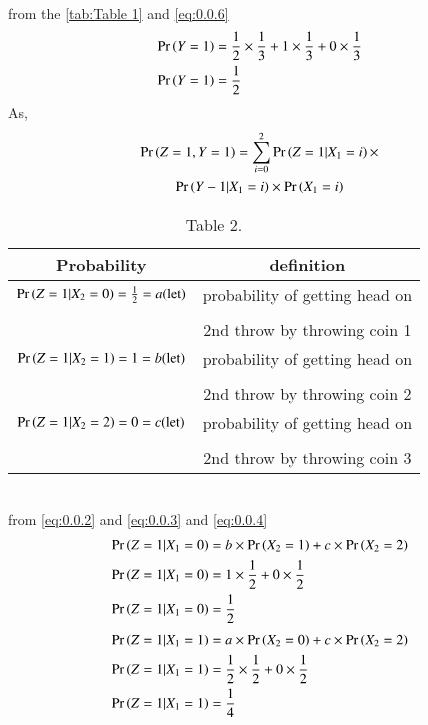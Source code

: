 \documentclass[journal,12pt,twocolumn]{IEEEtran}
\begin{document}
\\
from the \ref{tab:Table 1} and \eqref{eq:0.0.6}
\begin{align}
   \Pr\left(Y=1\right)&=\frac{1}{2} \times \frac{1}{3}+1 \times \frac{1}{3}+ 0 \times \frac{1}{3}\\
   \Pr\left(Y=1\right)&=\frac{1}{2}\label{eq:0.0.8}
\end{align}
\newpage
As,
\begin{multline}
    \Pr\left(Z=1,Y=1\right)=\sum_{i=0}^{2} \Pr\left(Z=1|X_1=i\right) \times \\\Pr\left(Y-1|X_1=i\right) \times  \Pr\left(X_1=i\right)
    \label{eq:0.0.9}
\end{multline}
\begin{table}[h!]
\resizebox{10cm}{!}
    {
    \begin{tabular}{|c|c|}
    \hline
    Probability & definition \\
        \hline
    $\Pr\left(Z=1|X_2=0\right)=\frac{1}{2}=a(\text{let})$ & probability of getting head  on \\& \\ &  2nd throw by throwing coin 1\\ 
         \hline
   $\Pr\left(Z=1|X_2=1\right)=1=b(\text{let})$ & probability of getting head on \\& \\& 2nd throw by throwing
         coin 2\\
         \hline
    $\Pr\left(Z=1|X_2=2\right)=0=c(\text{let})$ &probability of getting head on \\& \\&  2nd throw by throwing
         coin 3\\
         \hline
    \end{tabular}
    }
    \caption{\label{tab:Table 2}Table 2.}
    \end{table}
    \\ 
    from \eqref{eq:0.0.2} and \eqref{eq:0.0.3} and \eqref{eq:0.0.4}
    \begin{align}
    \Pr\left(Z=1|X_1=0\right)&=b\times \Pr\left(X_2=1\right)+ c \times \Pr\left(X_2=2\right)\\
        \Pr\left(Z=1|X_1=0\right)&=1 \times \frac{1}{2}+ 0 \times \frac{1}{2}\\
        \Pr\left(Z=1|X_1=0\right)&=\frac{1}{2}\label{eq:0.0.12}
    \end{align}
    \begin{align}
    \Pr\left(Z=1|X_1=1\right)&=a \times \Pr\left(X_2=0\right)+c \times \Pr\left(X_2=2\right)\\
        \Pr\left(Z=1|X_1=1\right)&=\frac{1}{2} \times \frac{1}{2} +0 \times \frac{1}{2}\\
        \Pr\left(Z=1|X_1=1\right)&=\frac{1}{4}\label{eq:0.0.15}
    \end{align}
\end{document}
